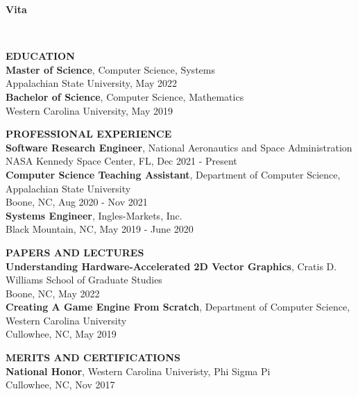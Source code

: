 \vspace*{0.5in}
\begin{center}
    \textbf{Vita}\\[2ex]
\end{center}

\flushleft

\bigskip
\bigskip
\large\textbf{EDUCATION}\normalsize\\
\medskip
\textbf{Master of Science}, Computer Science, Systems\\
Appalachian State University, May 2022\\
\medskip
\textbf{Bachelor of Science}, Computer Science, Mathematics\\
Western Carolina University, May 2019

\bigskip
\bigskip
\large\textbf{PROFESSIONAL EXPERIENCE}\normalsize\\
\medskip
\textbf{Software Research Engineer}, National Aeronautics and Space Administration\\
NASA Kennedy Space Center, FL, Dec 2021 - Present\\
\medskip
\textbf{Computer Science Teaching Assistant}, Department of Computer Science, Appalachian State University\\
Boone, NC, Aug 2020 - Nov 2021\\
\medskip
\textbf{Systems Engineer}, Ingles-Markets, Inc.\\
Black Mountain, NC, May 2019 - June 2020

\bigskip
\bigskip
\large\textbf{PAPERS AND LECTURES}\normalsize\\
\medskip
\textbf{Understanding Hardware-Accelerated 2D Vector Graphics}, Cratis D. Williams School of Graduate Studies\\
Boone, NC, May 2022\\
\medskip
\textbf{Creating A Game Engine From Scratch}, Department of Computer Science, Western Carolina University\\
Cullowhee, NC, May 2019

\bigskip
\bigskip
\large\textbf{MERITS AND CERTIFICATIONS}\normalsize\\
\medskip
\textbf{National Honor}, Western Carolina Univeristy, Phi Sigma Pi\\
Cullowhee, NC, Nov 2017
